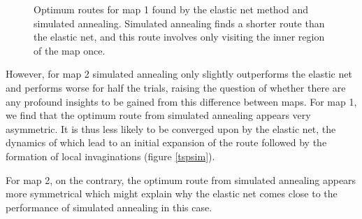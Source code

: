 \documentclass{article}
\begin{document}
\begin{figure}[h]
\begin{subfigure}[t]{0.28\linewidth}
		\label{fig:comp1an}	
	\end{subfigure}%
\caption{Optimum routes for map 1 found by the elastic net method and simulated annealing. Simulated annealing finds a shorter route than the elastic net, and this route involves only visiting the inner region of the map once. }
\label{fig:comp1}
\end{figure}

However, for map 2 simulated annealing only slightly outperforms the elastic net and performs worse for half the trials, raising the question of whether there are any profound insights to be gained from this difference between maps. For map 1, we find that the optimum route from simulated annealing appears very asymmetric. It is thus less likely to be converged upon by the elastic net, the dynamics of which lead to an initial expansion of the route followed by the formation of local invaginations (figure \ref{tspsim}).

For map 2, on the contrary, the optimum route from simulated annealing appears more symmetrical which might explain why the elastic net comes close to the performance of simulated annealing in this case.
\end{document}
